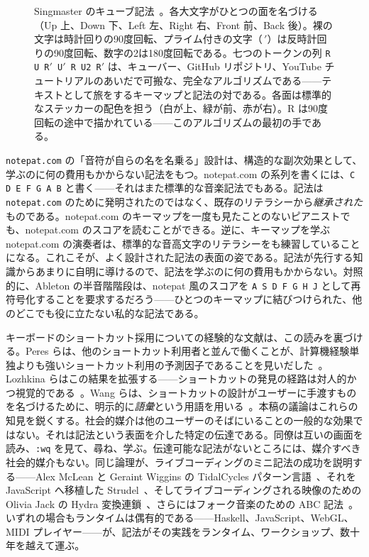 \documentclass[10pt,letterpaper,twocolumn]{article}
\begin{document}
\begin{figure}[t]
\caption{Singmaster のキューブ記法~\citep{singmaster1981notes}。各大文字がひとつの面を名づける（\textsf{U}p 上、\textsf{D}own 下、\textsf{L}eft 左、\textsf{R}ight 右、\textsf{F}ront 前、\textsf{B}ack 後）。裸の文字は時計回りの90度回転、プライム付きの文字（$\,'$）は反時計回りの90度回転、数字の2は180度回転である。七つのトークンの列 \texttt{R U R$'$ U$'$ R U2 R$'$} は、キューバー、GitHub リポジトリ、YouTube チュートリアルのあいだで可搬な、完全なアルゴリズムである——テキストとして旅をするキーマップと記法の対である。各面は標準的なステッカーの配色を担う（白が上、緑が前、赤が右）。\textsf{R} は90度回転の途中で描かれている——このアルゴリズムの最初の手である。}
\label{fig:singmaster}
\end{figure}

\texttt{notepat.com} の「音符が自らの名を名乗る」設計は、構造的な副次効果として、学ぶのに何の費用もかからない記法をもつ。notepat.com の系列を書くには、\texttt{C D E F G A B} と書く——それはまた標準的な音楽記法でもある。記法は \texttt{notepat.com} のために発明されたのではなく、既存のリテラシーから\emph{継承された}ものである。notepat.com のキーマップを一度も見たことのないピアニストでも、notepat.com のスコアを読むことができる。逆に、キーマップを学ぶ notepat.com の演奏者は、標準的な音高文字のリテラシーをも練習していることになる。これこそが、よく設計された記法の表面の姿である。記法が先行する知識からあまりに自明に導けるので、記法を学ぶのに何の費用もかからない。対照的に、Ableton の半音階階段は、notepat 風のスコアを \texttt{A S D F G H J} として再符号化することを要求するだろう——ひとつのキーマップに結びつけられた、他のどこでも役に立たない私的な記法である。

キーボードのショートカット採用についての経験的な文献は、この読みを裏づける。Peres らは、他のショートカット利用者と並んで働くことが、計算機経験単独よりも強いショートカット利用の予測因子であることを見いだした~\citep{peres2004shortcut}。Lozhkina らはこの結果を拡張する——ショートカットの発見の経路は対人的かつ視覚的である~\citep{lozhkina2025discovery}。Wang らは、ショートカットの設計がユーザーに手渡すものを名づけるために、明示的に\emph{語彙}という用語を用いる~\citep{wang2020keymap}。本稿の議論はこれらの知見を鋭くする。社会的媒介は他のユーザーのそばにいることの一般的な効果ではない。それは記法という表面を介した特定の伝達である。同僚は互いの画面を読み、\texttt{:wq} を見て、尋ね、学ぶ。伝達可能な記法がないところには、媒介すべき社会的媒介もない。同じ論理が、ライブコーディングのミニ記法の成功を説明する——Alex McLean と Geraint Wiggins の TidalCycles パターン言語~\citep{mclean2010tidal}、それを JavaScript へ移植した Strudel~\citep{roos2023strudel}、そしてライブコーディングされる映像のための Olivia Jack の Hydra 変換連鎖~\citep{jack2018hydra}、さらにはフォーク音楽のための ABC 記法~\citep{walshaw_abc}。いずれの場合もランタイムは偶有的である——Haskell、JavaScript、WebGL、MIDI プレイヤー——が、記法がその実践をランタイム、ワークショップ、数十年を越えて運ぶ。
\end{document}

